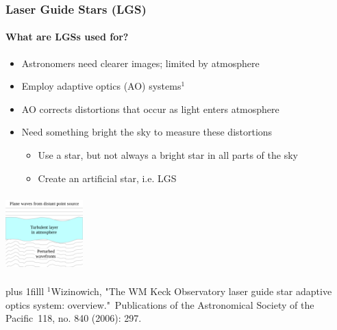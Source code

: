 \documentclass{beamer}
\newcommand{\btVFill}{\vskip0pt plus 1filll}
\begin{document}
\begin{frame}
  \frametitle{Laser Guide Stars (LGS)}
  \framesubtitle{What are LGSs used for?}
  \begin{itemize}
	\item Astronomers need clearer images; limited by atmosphere\\
	\item Employ adaptive optics (AO) systems$^1$
	\item AO corrects distortions that occur as light enters atmosphere \\
	\item Need something bright the sky to measure these distortions
	  \begin{minipage}{.5\textwidth}
	  \begin{itemize}
		\item Use a star, but not always a bright star in all parts of the sky
		\item Create an artificial star, i.e. LGS
	  \end{itemize}
	\end{minipage}
  \end{itemize}
  \hfill
  \begin{minipage}{.4\textwidth}
	\begin{center}
	  \vspace{-2cm}
	\includegraphics[width = 3cm, height = 3cm]{Images/adaptiveoptics1.png}
  \end{center}
  \end{minipage}
	  \bigskip
	  \btVFill
	  {\tiny $^1$Wizinowich, "The WM Keck Observatory laser guide star adaptive optics system: overview." Publications of the Astronomical Society of the Pacific 118, no. 840 (2006): 297.
}\\
\end{frame}
\end{document}
